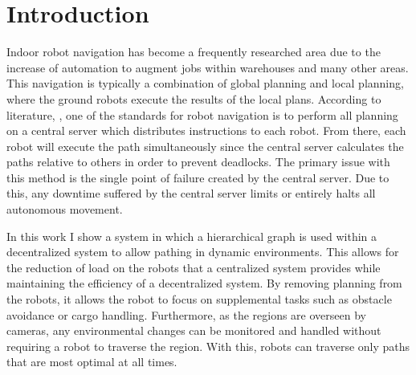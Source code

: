 \section{Introduction}
Indoor robot navigation has become a frequently researched area due to the increase of automation to augment jobs within warehouses and many other areas. This navigation is typically a combination of global planning and local planning, where the ground robots execute the results of the local plans. According to literature, \cite{PlanningSurveyParker}, one of the standards for robot navigation is to perform all planning on a central server which distributes instructions to each robot. From there, each robot will execute the path simultaneously since the central server calculates the paths relative to others in order to prevent deadlocks. The primary issue with this method is the single point of failure created by the central server.
Due to this, any downtime suffered by the central server limits or entirely halts all autonomous movement. 


In this work I show a system in which a hierarchical graph is used within a decentralized system to allow pathing in dynamic environments. This allows for the reduction of load on the robots that a centralized system provides while maintaining the efficiency of a decentralized system. By removing planning from the robots, it allows the robot to focus on supplemental tasks such as obstacle avoidance or cargo handling. Furthermore, as the regions are overseen by cameras, any environmental changes can be monitored and handled without requiring a robot to traverse the region. With this, robots can traverse only paths that are most optimal at all times. 

